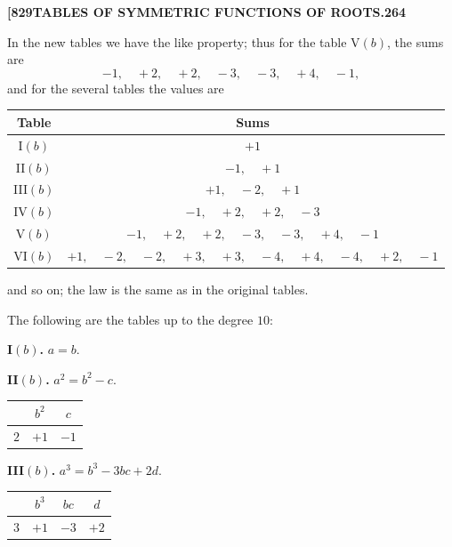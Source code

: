 \documentclass[12pt,a4paper]{article}
\theoremstyle{definition}
\begin{document}
\newpage
\setcounter{page}{264}

\noindent\textbf{[829}\hfill\textbf{TABLES OF SYMMETRIC FUNCTIONS OF ROOTS.}\hfill\textbf{264}

\bigskip

\noindent In the new tables we have the like property; thus for the table V$(b)$, the sums are
\[
-1,\quad +2,\quad +2,\quad -3,\quad -3,\quad +4,\quad -1,
\]
and for the several tables the values are

\begin{center}
\begin{tabular}{c|c}
\textbf{Table} & \textbf{Sums} \\
\hline
I$(b)$ & $+1$ \\
II$(b)$ & $-1,\quad +1$ \\
III$(b)$ & $+1,\quad -2,\quad +1$ \\
IV$(b)$ & $-1,\quad +2,\quad +2,\quad -3$ \\
V$(b)$ & $-1,\quad +2,\quad +2,\quad -3,\quad -3,\quad +4,\quad -1$ \\
VI$(b)$ & $+1,\quad -2,\quad -2,\quad +3,\quad +3,\quad -4,\quad +4,\quad -4,\quad +2,\quad -1$
\end{tabular}
\end{center}

\medskip

\noindent and so on; the law is the same as in the original tables.

The following are the tables up to the degree $10$:

\medskip

\noindent\textbf{I$(b)$.} $a = b$.

\medskip

\noindent\textbf{II$(b)$.} $a^2 = b^2 - c$.
\begin{center}
\begin{tabular}{c|c|c}
& $b^2$ & $c$ \\
\hline
$2$ & $+1$ & $-1$
\end{tabular}
\end{center}

\medskip

\noindent\textbf{III$(b)$.} $a^3 = b^3 - 3bc + 2d$.
\begin{center}
\begin{tabular}{c|c|c|c}
& $b^3$ & $bc$ & $d$ \\
\hline
$3$ & $+1$ & $-3$ & $+2$
\end{tabular}
\end{center}
\end{document}
